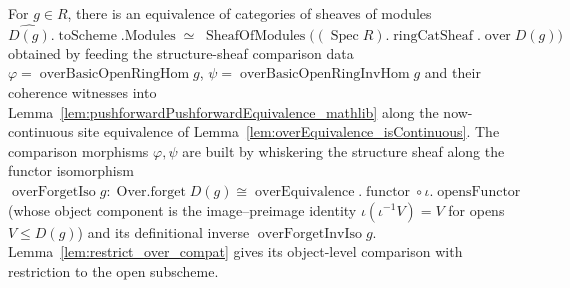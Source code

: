 \begin{definition}
  \label{def:modules_over_basicOpen_equivalence}
  For \(g \in R\), there is an equivalence of categories of sheaves of
  modules
  \[
    \widehat{D(g)}.\operatorname{toScheme}.\mathrm{Modules} \;\simeq\;
    \operatorname{SheafOfModules}\bigl((\operatorname{Spec} R).\operatorname{ringCatSheaf}.\operatorname{over} D(g)\bigr)
  \]
  obtained by feeding the structure-sheaf comparison data
  \(\varphi = \operatorname{overBasicOpenRingHom} g\),
  \(\psi = \operatorname{overBasicOpenRingInvHom} g\) and their coherence witnesses into
  Lemma~\ref{lem:pushforwardPushforwardEquivalence_mathlib} along the now-continuous site equivalence
  of Lemma~\ref{lem:overEquivalence_isContinuous}. The comparison morphisms \(\varphi, \psi\) are built
  by whiskering the structure sheaf along the functor isomorphism
  \(\operatorname{overForgetIso} g : \operatorname{Over.forget} D(g) \cong
  \operatorname{overEquivalence}.\operatorname{functor} \circ \iota.\operatorname{opensFunctor}\)
  (whose object component is the image--preimage identity
  \(\iota(\iota^{-1} V) = V\) for opens \(V \le D(g)\)) and its definitional inverse
  \(\operatorname{overForgetInvIso} g\). Lemma~\ref{lem:restrict_over_compat} gives its
  object-level comparison with restriction to the open subscheme.
\end{definition}

